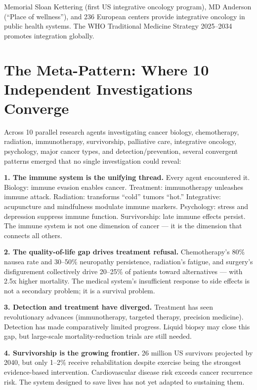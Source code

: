 Memorial Sloan Kettering (first US integrative oncology program), MD
Anderson (``Place of wellness''), and 236 European centers provide
integrative oncology in public health systems. The WHO Traditional
Medicine Strategy 2025--2034 promotes integration globally.

\newpage

\section{The Meta-Pattern: Where 10 Independent Investigations
Converge}\label{the-meta-pattern-where-10-independent-investigations-converge}

Across 10 parallel research agents investigating cancer biology,
chemotherapy, radiation, immunotherapy, survivorship, palliative care,
integrative oncology, psychology, major cancer types, and
detection/prevention, several convergent patterns emerged that no single
investigation could reveal:

\vspace{0.3cm}

\textbf{1. The immune system is the unifying thread.} Every agent
encountered it. Biology: immune evasion enables cancer. Treatment:
immunotherapy unleashes immune attack. Radiation: transforms ``cold''
tumors ``hot.'' Integrative: acupuncture and mindfulness modulate immune
markers. Psychology: stress and depression suppress immune function.
Survivorship: late immune effects persist. The immune system is not one
dimension of cancer --- it is the dimension that connects all others.

\textbf{2. The quality-of-life gap drives treatment refusal.}
Chemotherapy's 80\% nausea rate and 30--50\% neuropathy persistence,
radiation's fatigue, and surgery's disfigurement collectively drive
20--25\% of patients toward alternatives --- with 2.5x higher mortality.
The medical system's insufficient response to side effects is not a
secondary problem; it is a survival problem.

\textbf{3. Detection and treatment have diverged.} Treatment has seen
revolutionary advances (immunotherapy, targeted therapy, precision
medicine). Detection has made comparatively limited progress. Liquid
biopsy may close this gap, but large-scale mortality-reduction trials
are still needed.

\textbf{4. Survivorship is the growing frontier.} 26 million US
survivors projected by 2040, but only 1--2\% receive rehabilitation
despite exercise being the strongest evidence-based intervention.
Cardiovascular disease risk exceeds cancer recurrence risk. The system
designed to save lives has not yet adapted to sustaining them.

